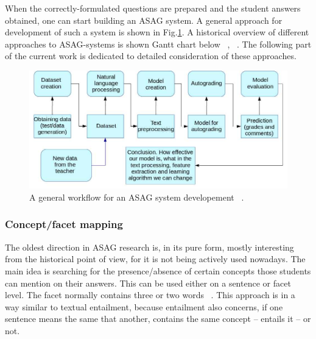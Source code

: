 \documentclass[11pt]{report}
\numberwithin{equation}{section} %
\begin{document}
When the correctly-formulated questions are prepared and the student answers obtained, one can start building an ASAG system. A general approach for development of such a system is shown in Fig.\ref{fig:workflowEN}. A historical overview of different approaches to ASAG-systems is shown Gantt chart below ~\cite{Hasanah}, ~\cite{Burrows}. The following part of the current work is dedicated to detailed consideration of these approaches.\\

\begin{figure}[h!]
  \centering
  \includegraphics[width=1.0\textwidth]{img/workflowEN}
    \caption{A general workflow for an ASAG system developement ~\cite{Burrows}.\label{fig:workflowEN}}
\end{figure}

\begin{preview}
\centering
{}
  \begin{gantt}{6}{10}
    \begin{ganttitle}
    \end{ganttitle}
  \end{gantt}
\end{preview}

\subsubsection{Concept/facet mapping}

The oldest direction in ASAG research is, in its pure form, mostly interesting from the historical point of view, for it is not being actively used nowadays. The main idea is searching for the presence/absence of certain concepts those students can mention on their answers. This can be used either on a sentence or facet level. The facet normally contains three or two words ~\cite{Burrows}. This approach is in a way similar to textual entailment, because entailment also concerns, if one sentence means the same that another, contains the same concept -- entails it -- or not.\\
\end{document}
